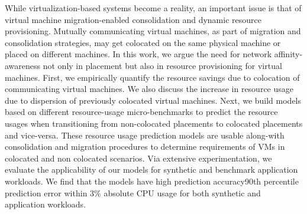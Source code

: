 
\label{abstract}

While virtualization-based systems become a reality, an important
issue is that of virtual machine migration-enabled consolidation 
and dynamic resource provisioning. Mutually communicating virtual machines,
as part of migration and consolidation strategies, may get colocated on
the same physical machine or placed on different machines. In this 
work, we argue the need for network affinity-awareness not only in 
placement but also in resource provisioning for virtual machines.
First, we empirically quantify the resource savings
due to colocation of communicating virtual machines. 
We also discuss the increase in resource usage due to dispersion of
previously colocated virtual machines. 
Next, we build models
based on different resource-usage micro-benchmarks to predict
the resource usages when transitioning from non-colocated placements to
colocated placements and vice-versa. 
These resource usage prediction models are usable along-with consolidation
and migration procedures to determine requirements of VMs in 
colocated and non colocated scenarios. Via extensive experimentation, 
we evaluate the applicability of our models for synthetic and benchmark
application workloads. We find that the models have high prediction 
accuracy\textemdash{}90th
percentile prediction error within 3\% absolute CPU usage for both
synthetic and application workloads.

%


